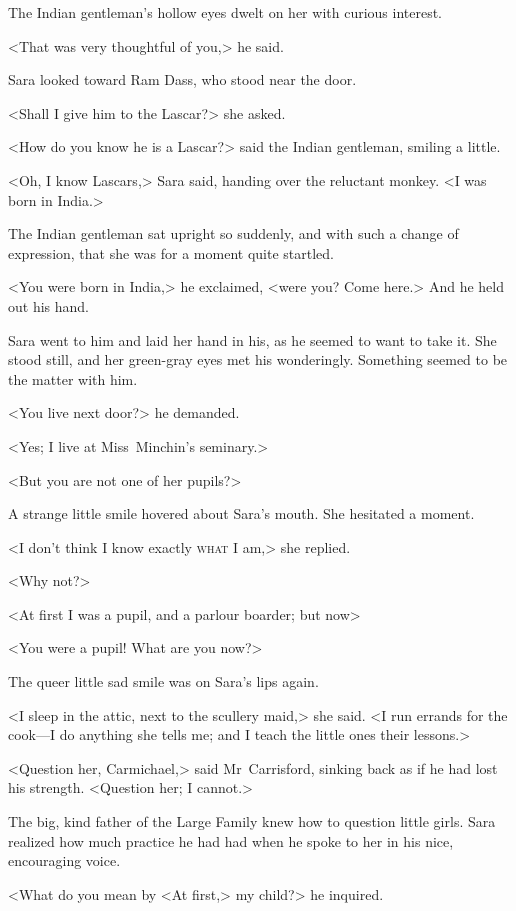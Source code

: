 The Indian gentleman's hollow eyes dwelt on her with curious interest.

<That was very thoughtful of you,> he said.

Sara looked toward Ram Dass, who stood near the door.

<Shall I give him to the Lascar?> she asked.

<How do you know he is a Lascar?> said the Indian gentleman, smiling a little.

<Oh, I know Lascars,> Sara said, handing over the reluctant monkey. <I was born in India.>

The Indian gentleman sat upright so suddenly, and with such a change of expression, that she was for a moment quite startled.

<You were born in India,> he exclaimed, <were you? Come here.> And he held out his hand.

Sara went to him and laid her hand in his, as he seemed to want to take it. She stood still, and her green-gray eyes met his wonderingly. Something seemed to be the matter with him.

<You live next door?> he demanded.

<Yes; I live at Miss~Minchin's seminary.>

<But you are not one of her pupils?>

A strange little smile hovered about Sara's mouth. She hesitated a moment.

<I don't think I know exactly \textsc{what} I am,> she replied.

<Why not?>

<At first I was a pupil, and a parlour boarder; but now\longdash>

<You were a pupil! What are you now?>

The queer little sad smile was on Sara's lips again.

<I sleep in the attic, next to the scullery maid,> she said. <I run errands for the cook—I do anything she tells me; and I teach the little ones their lessons.>

<Question her, Carmichael,> said Mr~Carrisford, sinking back as if he had lost his strength. <Question her; I cannot.>

The big, kind father of the Large Family knew how to question little girls. Sara realized how much practice he had had when he spoke to her in his nice, encouraging voice.

<What do you mean by <At first,> my child?> he inquired.

